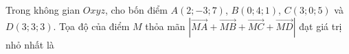 \begin{ex}
Trong không gian $Oxyz$, cho bốn điểm $A(2;-3;7)$, $B(0;4;1)$, $C(3;0;5)$ và $D(3;3;3)$. Tọa độ của điểm $M$ thỏa mãn $\left|\overrightarrow{MA}+\overrightarrow{MB}+\overrightarrow{MC}+\overrightarrow{MD}\right|$ đạt giá trị nhỏ nhất là
\end{ex}
